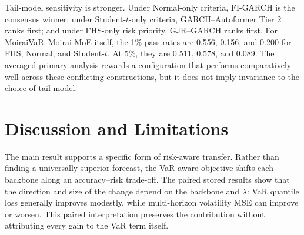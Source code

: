 \documentclass[runningheads]{llncs}
\begin{document}
Tail-model sensitivity is stronger. Under Normal-only criteria, FI-GARCH is the consensus winner; under Student-$t$-only criteria, GARCH--Autoformer Tier 2 ranks first; and under FHS-only risk priority, GJR--GARCH ranks first. For MoiraiVaR--Moirai-MoE itself, the 1\% pass rates are 0.556, 0.156, and 0.200 for FHS, Normal, and Student-$t$. At 5\%, they are 0.511, 0.578, and 0.089. The averaged primary analysis rewards a configuration that performs comparatively well across these conflicting constructions, but it does not imply invariance to the choice of tail model.

\section{Discussion and Limitations}
The main result supports a specific form of risk-aware transfer. Rather than finding a universally superior forecast, the VaR-aware objective shifts each backbone along an accuracy--risk trade-off. The paired stored results show that the direction and size of the change depend on the backbone and $\lambda$: VaR quantile loss generally improves modestly, while multi-horizon volatility MSE can improve or worsen. This paired interpretation preserves the contribution without attributing every gain to the VaR term itself.
\end{document}
